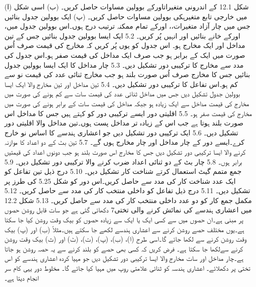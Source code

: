 (ا)	شکل 12.1 کے اندرونی متغیراتاورکے بوولین مساوات 	حاصل 	کریں۔
(ب)	اسی شکل میں خارجی تابع متغیرہکی بوولین مساوات حاصل کریں۔
(پ)	ایک بوولین جدول بنائیں جس میں چار آزاد متغیرات،، 	اورکے تمام ممکنہ ترتیب درج ہوں۔اس بوولین جدول میں،		اورکے خانے بنائیں اور انہیں پُر کریں۔    
5.2	ایک ایسا بوولین جدول بنائیں جس کے تین مداخل اور ایک مخارج ہو۔	اس جدول کو یوں پُر کریں کہ مخارج کی قیمت صرف اُس صورت میں ایک 	 کے برابر ہو جب صرف ایک مداخل کی قیمت صفر 	ہو۔اس جدول کی مدد سے مخارج کا ترکیبی دور تشکیل دیں۔
5.3	چار مداخل کا ایک ایسا بوولین جدول بنائیں جس کا مخارج صرف اُس 	صورت بلند  ہو جب مخارج ثنائی عدد کی قیمت نو  سے 	کم ہو۔اس تفاعل کا ترکیبی دور تشکیل دیں۔ 
5.4	تین مداخل اور تین مخارج والا ایک ایسا بوولین جدول تشکیل دیں جس 	میں مداخل ثنائی عدد کی قیمت سات  سے کم ہونے کی صورت 	میں مخارج کی قیمت مداخل سے ایک زیادہ ہو جبکہ مداخل کی قیمت 	سات کے برابر ہونے کی صورت میں مخارج کی قیمت صفر 	ہو۔
5.5	اقلیتی دور ایسے ترکیبی دور کو کہتے ہیں جس کا مداخل اس صورت بلند	 ہوتا ہے جب اس کے زیادہ تر مداخل پست ہوں۔تین 	مداخل والا اقلیتی دور تشکیل دیں۔
5.6	ایک ترکیبی دور تشکیل دیں جو اعشاری ہندسے کا اساس نو خارج 	کرے۔ایسے دور کے چار مداخل اور چار مخارج ہوں گے۔
5.7	تین بٹ کے دو اعداد کا موازنہ کرنے والا ایسا ترکیبی دور تشکیل دیں 	جس کا مخارج اس صورت بلند ہو جب دونوں اعداد کی قیمتیں 	برابر ہوں۔
5.8	چار بٹ کے دو ثنائی اعداد ضرب کرنے والا ترکیبی دور تشکیل دیں۔
5.9	جمع متمم گیٹ استعمال کرتے  شناخت کار تشکیل دیں۔
5.10	درج ذیل تین تفاعل کو ایک عدد  شناخت کار کی مدد سے حاصل کریں۔اس دور کو شکل 5.25 کی طرز پر تشکیل دیں۔
5.11	درج ذیل تفاعل کو داخلی منتخب کار  کی مدد سے حاصل 	کریں۔
5.12	مکمل جمع کار کو دو عدد داخلی منتخب کار کی مدد سے حاصل کریں۔
5.13	شکل 12.2 میں اعشاری ہندسے کی نمائش کرنے والی تختی7 دکھائی 	گئی ہے جو  سات قابل روشن حصوں پر مبنی ہے۔ان حصوں میں سے 	کسی ایک یا ایک سے زیادہ حصوں کو  بیک وقت روشن کیا جا سکتا 	ہے۔یوں مختلف	حصے روشن کرنے سے اعشاری ہندسے لکھے جا 	سکتے ہیں۔مثلاً	(ب) اور (پ)  بیک وقت روشن کرنے سے  	لکھا جائے گا۔اسی طرح (ا)، (ب)، (پ)، (ت)، (ٹ) اور (ث) بیک 	وقت روشن کرنے سےلکھا جا سکتا ہے۔
		فرض کریں کہ کسی بھی حصے کو بلند  کرنے سے یہ 	حصہ روشن ہو جاتا ہے۔چار مداخل اور سات مخارج والا  ایسا ترکیبی 	دور تشکیل دیں جو مہیا کردہ اعشاری ہندسے کو اس تختی پر دکھلائے۔	اعشاری ہندسہ کو ثنائی علامتی روپ میں مہیا کیا جائے گا۔
		مخلوط دور یہی کام سر انجام دیتا ہے۔
